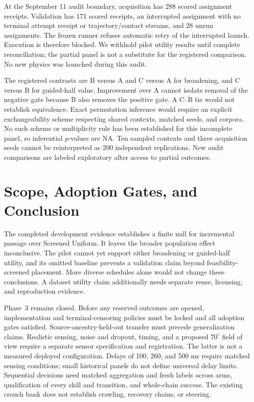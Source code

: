 \documentclass[letterpaper,10pt,conference]{ieeeconf}
\begin{document}
At the September 11 audit boundary, acquisition has 288 scored assignment
receipts. Validation has 171 scored receipts, an interrupted assignment with
no terminal attempt receipt or trajectory/contact streams, and 28 unrun
assignments. The frozen runner refuses automatic retry of the interrupted
launch. Execution is therefore blocked. We withhold pilot utility results
until complete reconciliation; the partial panel is not a substitute for the
registered comparison. No new physics was launched during this audit.

The registered contrasts are B versus A and C versus A for broadening, and C
versus B for guided-half value. Improvement over A cannot isolate removal of the
negative gate because B also removes the positive gate. A C--B tie would not
establish equivalence. Exact permutation inference would require an explicit
exchangeability scheme respecting shared contexts, matched seeds, and corpora.
No such scheme or multiplicity rule has been established for this incomplete
panel, so inferential $p$-values are NA. Ten sampled contexts and three acquisition
seeds cannot be reinterpreted as 200 independent replications. New audit
comparisons are labeled exploratory after access to partial outcomes.

\section{Scope, Adoption Gates, and Conclusion}
The completed development evidence establishes a finite null for incremental
passage over Screened Uniform. It leaves the broader population effect
inconclusive. The pilot cannot yet support either broadening or guided-half
utility, and its omitted baseline prevents a validation claim beyond
feasibility-screened placement. More diverse schedules alone would not change
these conclusions. A dataset utility claim additionally needs separate reuse,
licensing, and reproduction evidence.

Phase~3 remains closed. Before any reserved outcomes are opened, implementation
and terminal-censoring policies must be locked and all adoption gates satisfied.
Source-ancestry-held-out transfer must precede generalization claims. Realistic
sensing, noise and dropout, timing, and a proposed $70^\circ$ field of view require
a separate sensor specification and registration. The latter is not a measured
deployed configuration. Delays of 100, 260, and 500 ms require matched sensing
conditions; small historical panels do not define universal delay limits.
Sequential decisions need matched aggregation and fresh labels across arms,
qualification of every skill and transition, and whole-chain success. The
existing crouch bank does not establish crawling, recovery chains, or steering.
\end{document}
